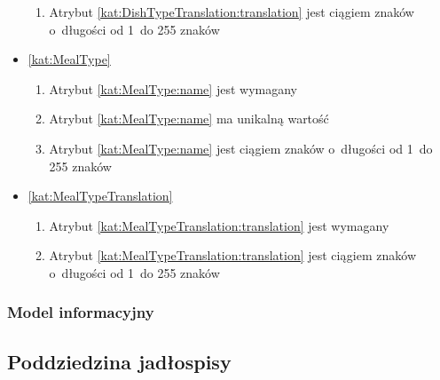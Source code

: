 \begin{itemize}[label={\textbf{Ograniczenia dla}}, wide, labelwidth=!, labelindent=0pt]
\begin{enumerate}[label={\textbf{OGR/3/\protect\twodigits{\arabic{enumi}}}}, wide, labelwidth=!, align=left, leftmargin=3cm, resume]
        \item Atrybut \ref{kat:DishTypeTranslation:translation} jest ciągiem znaków o~długości od 1~do 255 znaków
    \end{enumerate}

    \item\ref{kat:MealType}\mynobreakpar
    \begin{enumerate}[label={\textbf{OGR/3/\protect\twodigits{\arabic{enumi}}}}, wide, labelwidth=!, align=left, leftmargin=3cm, resume]
        \item Atrybut \ref{kat:MealType:name} jest wymagany

        \item Atrybut \ref{kat:MealType:name} ma unikalną wartość

        \item Atrybut \ref{kat:MealType:name} jest ciągiem znaków o~długości od 1~do 255 znaków
    \end{enumerate}

    \item\ref{kat:MealTypeTranslation}\mynobreakpar
    \begin{enumerate}[label={\textbf{OGR/3/\protect\twodigits{\arabic{enumi}}}}, wide, labelwidth=!, align=left, leftmargin=3cm, resume]
        \item Atrybut \ref{kat:MealTypeTranslation:translation} jest wymagany

        \item Atrybut \ref{kat:MealTypeTranslation:translation} jest ciągiem znaków o~długości od 1~do 255 znaków
    \end{enumerate}
\end{itemize}

\subsubsection{Model informacyjny}\label{subsubsec:database:recipes:domainModel}


\subsection{Poddziedzina jadłospisy}\label{subsec:database:mealplans}

